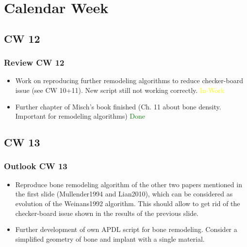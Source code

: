 \section{Calendar Week}
\subsection{CW 12}
\begin{frame}
  \frametitle{Review CW 12}
	\begin{itemize}
		\item Work on reproducing further remodeling algorithms to reduce checker-board issue (see CW 10+11). New script still not working correctly. \textcolor{yellow}{In-Work}
		\item Further chapter of Misch's book finished (Ch. 11 about bone density. Important for remodeling algorithms) \textcolor{green}{Done}
	\end{itemize}
\end{frame}

\subsection{CW 13}
\begin{frame}
  \frametitle{Outlook CW 13}
	\begin{itemize}
		\item Reproduce bone remodeling algorithm of the other two papers mentioned in the first slide (Mullender1994 and Lian2010), which can be considered as evolution of the Weinans1992 algorithm. This should allow to get rid of the checker-board issue shown in the results of the previous slide.
		\item Further development of own APDL script for bone remodeling. Consider a simplified geometry of bone and implant with a single material.
	\end{itemize}
\end{frame}

